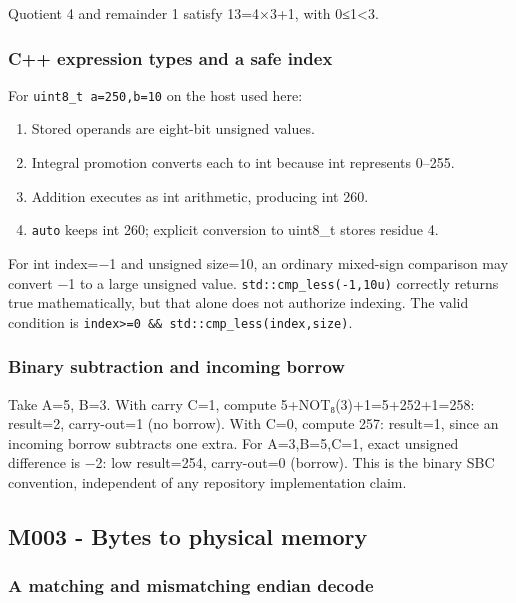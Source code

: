 Quotient 4 and remainder 1 satisfy 13=4×3+1, with 0≤1\textless3.

\subsubsection{C++ expression types and a safe index}\label{appendix-92ff77d4dfdc-c-expression-types-and-a-safe-index}

For \texttt{uint8\_t\ a=250,b=10} on the host used here:

\begin{enumerate}
\def\labelenumi{\arabic{enumi}.}
\tightlist
\item
  Stored operands are eight-bit unsigned values.
\item
  Integral promotion converts each to int because int represents 0--255.
\item
  Addition executes as int arithmetic, producing int 260.
\item
  \texttt{auto} keeps int 260; explicit conversion to uint8\_t stores residue 4.
\end{enumerate}

For int index=−1 and unsigned size=10, an ordinary mixed-sign comparison may convert −1 to a large unsigned value. \texttt{std::cmp\_less(-1,10u)} correctly returns true mathematically, but that alone does not authorize indexing. The valid condition is \texttt{index\textgreater{}=0\ \&\&\ std::cmp\_less(index,size)}.

\subsubsection{Binary subtraction and incoming borrow}\label{appendix-92ff77d4dfdc-binary-subtraction-and-incoming-borrow}

Take A=5, B=3. With carry C=1, compute 5+NOT₈(3)+1=5+252+1=258: result=2, carry-out=1 (no borrow). With C=0, compute 257: result=1, since an incoming borrow subtracts one extra. For A=3,B=5,C=1, exact unsigned difference is −2: low result=254, carry-out=0 (borrow). This is the binary SBC convention, independent of any repository implementation claim.

\subsection{M003 - Bytes to physical memory}\label{appendix-92ff77d4dfdc-m003---bytes-to-physical-memory}

\subsubsection{A matching and mismatching endian decode}\label{appendix-92ff77d4dfdc-a-matching-and-mismatching-endian-decode}

